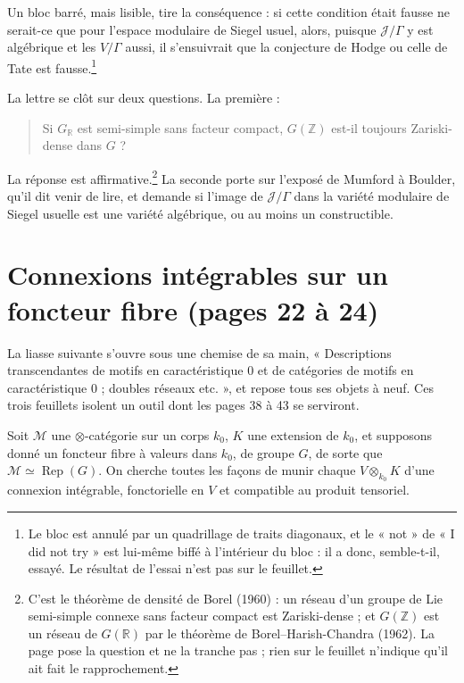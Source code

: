 \documentclass[11pt,a4paper]{article}
\begin{document}
Un bloc barré, mais lisible, tire la conséquence : si cette condition était
fausse ne serait-ce que pour l'espace modulaire de Siegel usuel, alors, puisque
$\mathcal{J}/\Gamma$ y est algébrique et les $V/\Gamma$ aussi, il
s'ensuivrait que la conjecture de Hodge ou celle de Tate est fausse.\footnote{Le
bloc est annulé par un quadrillage de traits diagonaux, et le « not » de « I did
not try » est lui-même biffé à l'intérieur du bloc : il a donc, semble-t-il,
essayé. Le résultat de l'essai n'est pas sur le feuillet.}

La lettre se clôt sur deux questions. La première :

\begin{quote}
Si $G_{\mathbb{R}}$ est semi-simple sans facteur compact, $G(\mathbb{Z})$ est-il
toujours Zariski-dense dans $G$ ?
\end{quote}

La réponse est affirmative.\footnote{C'est le théorème de densité de Borel
(1960) : un réseau d'un groupe de Lie semi-simple connexe sans facteur compact
est Zariski-dense ; et $G(\mathbb{Z})$ est un réseau de $G(\mathbb{R})$ par le
théorème de Borel--Harish-Chandra (1962). La page pose la question et ne la
tranche pas ; rien sur le feuillet n'indique qu'il ait fait le rapprochement.}
La seconde porte sur l'exposé de Mumford à Boulder, qu'il dit venir de lire, et
demande si l'image de $\mathcal{J}/\Gamma$ dans la variété modulaire de Siegel
usuelle est une variété algébrique, ou au moins un constructible.

\section*{Connexions intégrables sur un foncteur fibre (pages 22 à 24)}

La liasse suivante s'ouvre sous une chemise de sa main, « Descriptions
transcendantes de motifs en caractéristique $0$ et de catégories de motifs en
caractéristique $0$ ; doubles réseaux etc. », et repose tous ses objets à
neuf. Ces trois feuillets isolent un outil dont les pages 38 à 43 se serviront.

Soit $\mathcal{M}$ une $\otimes$-catégorie sur un corps $k_{0}$, $K$ une
extension de $k_{0}$, et supposons donné un foncteur fibre à valeurs dans
$k_{0}$, de groupe $G$, de sorte que $\mathcal{M} \simeq \operatorname{Rep}(G)$.
On cherche toutes les façons de munir chaque $V \otimes_{k_{0}} K$ d'une
connexion intégrable, fonctorielle en $V$ et compatible au produit tensoriel.
\end{document}
